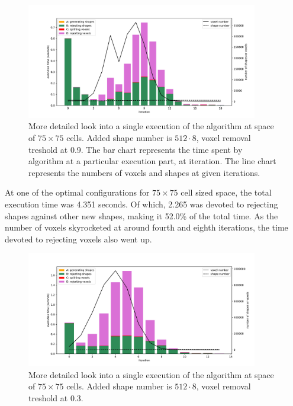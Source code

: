 \documentclass[12pt, oneside]{report}
\begin{document}
\begin{figure}[H]
  \centering
	\includegraphics[width=0.9\textwidth,keepaspectratio]{Images/SummaryOptimisation/iter_75_512x8_09_v2.pdf}
	\caption{More detailed look into a single execution of the algorithm at space of $75 \times 75$ cells. Added shape number is $512 \cdot 8$, voxel removal treshold at 0.9. The bar chart represents the time spent by algorithm at a particular execution part, at iteration. The line chart represents the numbers of voxels and shapes at given iterations.}
	\label{summary_detail_75_512x8_09}
\end{figure}

At one of the optimal configurations for $75 \times 75$ cell sized space, the total execution time was 4.351 seconds. Of which, 2.265 was devoted to rejecting shapes against other new shapes, making it 52.0\% of the total time. As the number of voxels skyrocketed at around fourth and eighth iterations, the time devoted to rejecting voxels also went up.

\begin{figure}[H]
  \centering
	\includegraphics[width=0.9\textwidth,keepaspectratio]{Images/SummaryOptimisation/iter_75_512x8_03_v2.pdf}
	\caption{More detailed look into a single execution of the algorithm at space of $75 \times 75$ cells. Added shape number is $512 \cdot 8$, voxel removal treshold at 0.3.}
	\label{summary_detail_75_512x8_03}
\end{figure}
\end{document}

